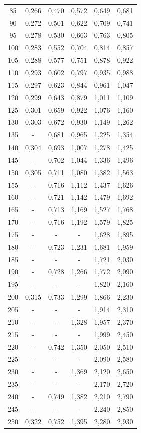 \begin{table}
\begin{tabular}{c c c c c c}
 85 & 0,266 & 0,470 & 0,572 & 0,649 & 0,681 \\
 90 & 0,272 & 0,501 & 0,622 & 0,709 & 0,741 \\
 95 & 0,278 & 0,530 & 0,663 & 0,763 & 0,805 \\
100 & 0,283 & 0,552 & 0,704 & 0,814 & 0,857 \\
105 & 0,288 & 0,577 & 0,751 & 0,878 & 0,922 \\
110 & 0,293 & 0,602 & 0,797 & 0,935 & 0,988 \\
115 & 0,297 & 0,623 & 0,844 & 0,961 & 1,047 \\
120 & 0,299 & 0,643 & 0,879 & 1,011 & 1,109 \\
125 & 0,301 & 0,659 & 0,922 & 1,076 & 1,160 \\
130 & 0,303 & 0,672 & 0,930 & 1,149 & 1,262 \\
135 &   -   & 0,681 & 0,965 & 1,225 & 1,354 \\
140 & 0,304 & 0,693 & 1,007 & 1,278 & 1,425 \\
145 &   -   & 0,702 & 1,044 & 1,336 & 1,496 \\
150 & 0,305 & 0,711 & 1,080 & 1,382 & 1,563 \\
155 &   -   & 0,716 & 1,112 & 1,437 & 1,626 \\
160 &   -   & 0,721 & 1,142 & 1,479 & 1,692 \\
165 &   -   & 0,713 & 1,169 & 1,527 & 1,768 \\
170 &   -   & 0,716 & 1,192 & 1,579 & 1,825 \\
175 &   -   &   -   &   -   & 1,628 & 1,895 \\
180 &   -   & 0,723 & 1,231 & 1,681 & 1,959 \\
185 &   -   &   -   &   -   & 1,721 & 2,030 \\
190 &   -   & 0,728 & 1,266 & 1,772 & 2,090 \\
195 &   -   &   -   &   -   & 1,820 & 2,160 \\
200 & 0,315 & 0,733 & 1,299 & 1,866 & 2,230 \\
205 &   -   &   -   &   -   & 1,914 & 2,310 \\
210 &   -   &   -   & 1,328 & 1,957 & 2,370 \\
215 &   -   &   -   &   -   & 1,999 & 2,450 \\
220 &   -   & 0,742 & 1,350 & 2,050 & 2,510 \\
225 &   -   &   -   &   -   & 2,090 & 2,580 \\
230 &   -   &   -   & 1,369 & 2,120 & 2,650 \\
235 &   -   &   -   &   -   & 2,170 & 2,720 \\
240 &   -   & 0,749 & 1,382 & 2,210 & 2,790 \\
245 &   -   &   -   &   -   & 2,240 & 2,850 \\
250 & 0,322 & 0,752 & 1,395 & 2,280 & 2,930 \\
  \bottomrule
  \end{tabular}
  \end{table}

